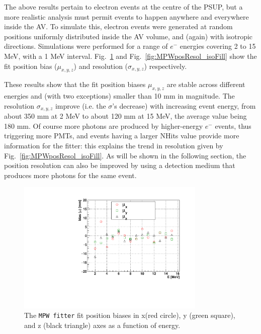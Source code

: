 The above results pertain to electron events at the centre of the PSUP, but a more realistic analysis must permit events to happen anywhere and everywhere inside the AV. To simulate this, electron events were generated at random positions uniformly distributed inside the AV volume, and (again) with isotropic directions. Simulations were performed for a range of $e^-$ energies covering 2 to 15 MeV, with a 1 MeV interval. Fig.~\ref{fig:MPWposBias_isoFill} and Fig.~\ref{fig:MPWposResol_isoFill} show the fit position bias ($\mu_{x,y,z}$) and resolution ($\sigma_{x,y,z}$) respectively. 

These results show that the fit position biases $\mu_{x,y,z}$ are stable across different energies and (with two exceptions) smaller than 10 mm in magnitude. The resolution $\sigma_{x,y,z}$ improve (i.e. the $\sigma$'s decrease) with increasing event energy, from about 350 mm at 2 MeV to about 120 mm at 15 MeV, the average value being 180 mm. Of course more photons are produced by higher-energy $e^-$ events, thus triggering more PMTs, and events having a larger NHits value provide more information for the fitter: this explains the trend in resolution given by Fig.~\ref{fig:MPWposResol_isoFill}. As will be shown in the following section, the position resolution can also be improved by using a detection medium that produces more photons for the same event. 

\begin{figure}[htbp]
	\centering	
	\includegraphics[width=9cm]{MPW_isoFill_posBiasVsE.pdf}
	\caption[The \texttt{MPW fitter} fit position biases ($\mu_{x,y,z}$) as a function of energy.]{The \texttt{MPW fitter} fit position biases in x(red circle), y (green square), and z (black triangle) axes as a function of energy. \label{fig:MPWposBias_isoFill}}
\end{figure}

